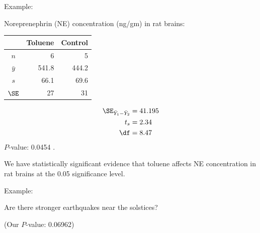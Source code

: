 \begin{frame}{Example: }

    Noreprenephrin (NE) concentration (ng/gm) in rat brains:
    \begin{center}
      \begin{tabular}{c|rr}
            & Toluene & Control \\
          \hline
          $n$ & 6 & 5 \\
          $\bar y$ & 541.8 & 444.2 \\
          $s$  & 66.1 & 69.6 \\
          $\SE$ & 27 & 31 \\
     \end{tabular}
   \end{center}


     \begin{align*}
         \SE_{\bar Y_1 - \bar Y_2} &= 41.195 \\
         t_s &= 2.34  \\
         \df &= 8.47 
     \end{align*}
     $P$-value: 0.0454 .


  \vspace{2em}

  We have statistically significant evidence that toluene affects NE concentration in rat brains at the 0.05 significance level.
  \pause

\end{frame}

\begin{frame}{Example: }

  Are there stronger earthquakes near the solstices?

  \vspace{2em}

  (Our $P$-value: 0.06962)

\end{frame}

